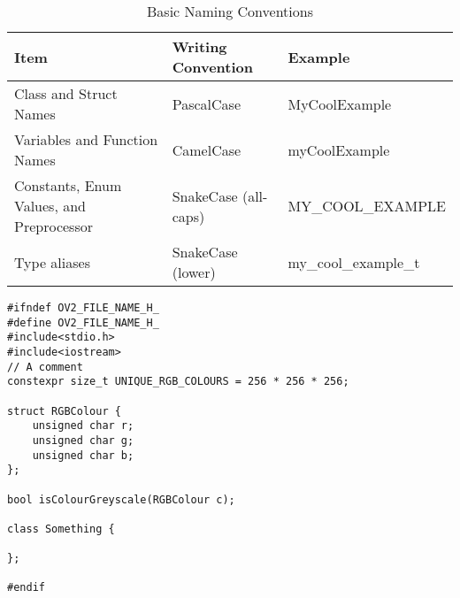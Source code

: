 \documentclass{article}
\begin{document}
\begin{table}[!ht]
	\begin{center}
		\caption{Basic Naming Conventions}
	\begin{tabular}{|l|l|l|}
		\hline
		\bf Item & \bf Writing Convention & \bf Example \\
		\hline
		Class and Struct Names                   & PascalCase           & MyCoolExample \\
		Variables and Function Names             & CamelCase            & myCoolExample \\
		Constants, Enum Values, and Preprocessor & SnakeCase (all-caps) & MY\_COOL\_EXAMPLE \\
		Type aliases                             & SnakeCase (lower)    & my\_cool\_example\_t \\
		\hline
	\end{tabular}
	\end{center}
\end{table}

\begin{lstlisting}
#ifndef OV2_FILE_NAME_H_
#define OV2_FILE_NAME_H_
#include<stdio.h>
#include<iostream>
// A comment
constexpr size_t UNIQUE_RGB_COLOURS = 256 * 256 * 256;

struct RGBColour {
	unsigned char r;
	unsigned char g;
	unsigned char b;
};

bool isColourGreyscale(RGBColour c);

class Something {

};

#endif
\end{lstlisting}

\end{document}
